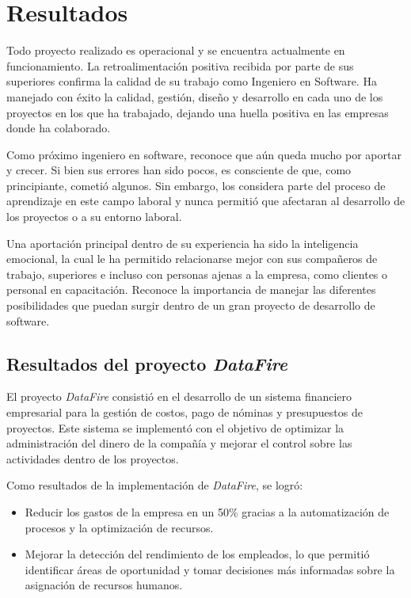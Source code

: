 \documentclass[protocolo.tex]{subfiles}
\begin{document}
\section{Resultados}
Todo proyecto realizado es operacional y se encuentra actualmente en funcionamiento. La retroalimentación positiva recibida por parte de sus superiores  confirma la calidad de su trabajo como Ingeniero en Software. Ha manejado con éxito la calidad, gestión, diseño y desarrollo en cada uno de los proyectos en los que ha trabajado, dejando una huella positiva en las empresas donde ha colaborado.\vspace{4mm}

Como próximo ingeniero en software, reconoce que aún queda mucho por aportar y crecer.  Si bien sus errores han sido pocos,  es consciente de que, como principiante,  cometió algunos.  Sin embargo,  los considera parte del proceso de aprendizaje en este campo laboral y  nunca permitió que afectaran al desarrollo de los proyectos o a su entorno laboral.\vspace{4mm}

Una aportación principal dentro de su experiencia ha sido la inteligencia emocional, la cual le ha permitido  relacionarse mejor con sus compañeros de trabajo, superiores e incluso con personas ajenas a la empresa, como clientes o personal en capacitación.  Reconoce la importancia de  manejar las diferentes  posibilidades que puedan surgir dentro de un gran proyecto de desarrollo de software.

\subsection{Resultados del proyecto \textit{DataFire}}

El proyecto \textit{DataFire} consistió en el desarrollo de un sistema financiero empresarial para la gestión de costos, pago de nóminas y presupuestos de proyectos. Este sistema se implementó con el objetivo de optimizar la administración del dinero de la compañía y mejorar el control sobre las actividades dentro de los proyectos.\vspace{4mm}

Como resultados de la implementación de \textit{DataFire}, se logró:

\begin{itemize}
\item Reducir los gastos de la empresa en un 50\% gracias a la automatización de procesos y la optimización de recursos.
\item Mejorar la detección del rendimiento de los empleados, lo que permitió identificar áreas de oportunidad y tomar decisiones más informadas sobre la asignación de recursos humanos.
\end{itemize}
\end{document}
